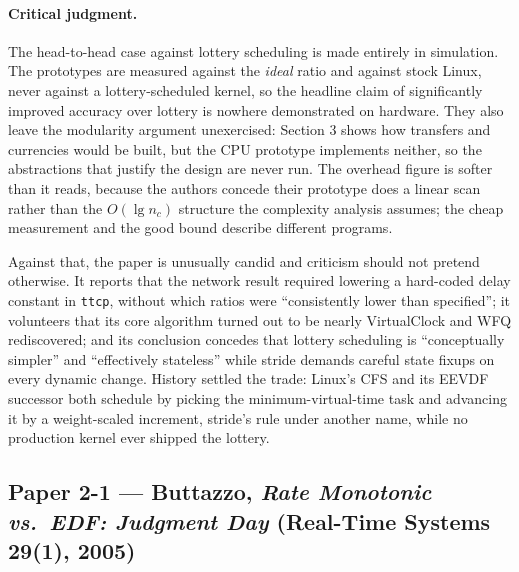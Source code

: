 \paragraph{Critical judgment.}
The head-to-head case against lottery scheduling is made entirely in simulation. The prototypes
are measured against the \emph{ideal} ratio and against stock Linux, never against a
lottery-scheduled kernel, so the headline claim of significantly improved accuracy over lottery
is nowhere demonstrated on hardware. They also leave the modularity argument unexercised:
Section 3 shows how transfers and currencies would be built, but the CPU prototype implements
neither, so the abstractions that justify the design are never run. The overhead figure is softer
than it reads, because the authors concede their prototype does a linear scan rather than the
$O(\lg n_c)$ structure the complexity analysis assumes; the cheap measurement and the good bound
describe different programs.

Against that, the paper is unusually candid and criticism should not pretend otherwise. It
reports that the network result required lowering a hard-coded delay constant in \texttt{ttcp},
without which ratios were ``consistently lower than specified''; it volunteers that its core
algorithm turned out to be nearly VirtualClock and WFQ rediscovered; and its conclusion concedes
that lottery scheduling is ``conceptually simpler'' and ``effectively stateless'' while stride
demands careful state fixups on every dynamic change. History settled the trade: Linux's CFS and
its EEVDF successor both schedule by picking the minimum-virtual-time task and advancing it by a
weight-scaled increment, stride's rule under another name, while no production kernel ever
shipped the lottery.

\subsection*{Paper 2-1 --- Buttazzo, \emph{Rate Monotonic vs.\ EDF: Judgment Day} (Real-Time Systems 29(1), 2005)}

